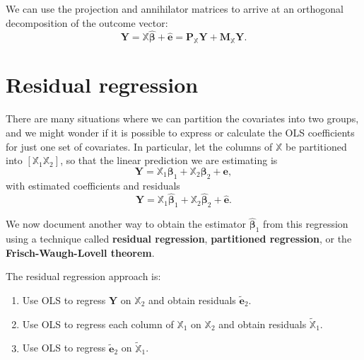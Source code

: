 \documentclass[
  letterpaper,
  DIV=11,
  numbers=noendperiod]{scrreprt}
\providecommand{\tightlist}{%
  \setlength{\itemsep}{0pt}\setlength{\parskip}{0pt}}\usepackage{longtable,booktabs,array}
\newcommand{\mb}{\symbf}
\newcommand{\Xmat}{\mathbb{X}}
\newcommand{\bfbeta}{\mb{\beta}}
\newcommand{\bhat}{\widehat{\mb{\beta}}}
\theoremstyle{plain}
\theoremstyle{definition}
\theoremstyle{definition}
\theoremstyle{remark}
\begin{document}
We can use the projection and annihilator matrices to arrive at an
orthogonal decomposition of the outcome vector: \[ 
\mb{Y} = \Xmat\bhat + \widehat{\mb{e}} = \mb{P}_{\Xmat}\mb{Y} + \mb{M}_{\Xmat}\mb{Y}.
\]

\hypertarget{residual-regression}{%
\section{Residual regression}\label{residual-regression}}

There are many situations where we can partition the covariates into two
groups, and we might wonder if it is possible to express or calculate
the OLS coefficients for just one set of covariates. In particular, let
the columns of \(\Xmat\) be partitioned into \([\Xmat_{1} \Xmat_{2}]\),
so that the linear prediction we are estimating is \[ 
\mb{Y} = \Xmat_{1}\bfbeta_{1} + \Xmat_{2}\bfbeta_{2} + \mb{e}, 
\] with estimated coefficients and residuals \[ 
\mb{Y} = \Xmat_{1}\bhat_{1} + \Xmat_{2}\bhat_{2} + \widehat{\mb{e}}.
\]

We now document another way to obtain the estimator \(\bhat_1\) from
this regression using a technique called \textbf{residual regression},
\textbf{partitioned regression}, or the \textbf{Frisch-Waugh-Lovell
theorem}.

\begin{tcolorbox}[enhanced jigsaw, opacityback=0, breakable, bottomtitle=1mm, opacitybacktitle=0.6, coltitle=black, leftrule=.75mm, toptitle=1mm, colback=white, titlerule=0mm, colframe=quarto-callout-note-color-frame, rightrule=.15mm, bottomrule=.15mm, toprule=.15mm, title=\textcolor{quarto-callout-note-color}{\faInfo}\hspace{0.5em}{Residual regression approach}, left=2mm, arc=.35mm, colbacktitle=quarto-callout-note-color!10!white]

The residual regression approach is:

\begin{enumerate}
\def\labelenumi{\arabic{enumi}.}
\tightlist
\item
  Use OLS to regress \(\mb{Y}\) on \(\Xmat_2\) and obtain residuals
  \(\widetilde{\mb{e}}_2\).
\item
  Use OLS to regress each column of \(\Xmat_1\) on \(\Xmat_2\) and
  obtain residuals \(\widetilde{\Xmat}_1\).
\item
  Use OLS to regress \(\widetilde{\mb{e}}_{2}\) on
  \(\widetilde{\Xmat}_1\).
\end{enumerate}

\end{tcolorbox}
\end{document}
